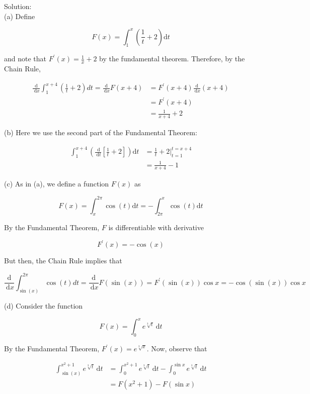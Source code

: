 \documentclass[10pt]{article}
\begin{document}
Solution:\\
(a) Define

$$
F(x)=\int_{1}^{x}\left(\frac{1}{t}+2\right) \mathrm{d} t
$$

and note that $F^{\prime}(x)=\frac{1}{x}+2$ by the fundamental theorem. Therefore, by the Chain Rule,

$$
\begin{aligned}
\frac{\mathrm{d}}{\mathrm{~d} x} \int_{1}^{x+4}\left(\frac{1}{t}+2\right) d t=\frac{\mathrm{d}}{\mathrm{~d} x} F(x+4) & =F^{\prime}(x+4) \frac{\mathrm{d}}{\mathrm{~d} x}(x+4) \\
& =F^{\prime}(x+4) \\
& =\frac{1}{x+4}+2
\end{aligned}
$$

(b) Here we use the second part of the Fundamental Theorem:

$$
\begin{aligned}
\int_{1}^{x+4}\left(\frac{\mathrm{~d}}{\mathrm{~d} t}\left[\frac{1}{t}+2\right]\right) \mathrm{d} t & =\frac{1}{t}+\left.2\right|_{t=1} ^{t=x+4} \\
& =\frac{1}{x+4}-1
\end{aligned}
$$

(c) As in (a), we define a function $F(x)$ as

$$
F(x)=\int_{x}^{2 \pi} \cos (t) \mathrm{d} t=-\int_{2 \pi}^{x} \cos (t) \mathrm{d} t
$$

By the Fundamental Theorem, $F$ is differentiable with derivative

$$
F^{\prime}(x)=-\cos (x)
$$

But then, the Chain Rule implies that

$$
\frac{\mathrm{d}}{\mathrm{~d} x} \int_{\sin (x)}^{2 \pi} \cos (t) d t=\frac{\mathrm{d}}{\mathrm{~d} x} F(\sin (x))=F^{\prime}(\sin (x)) \cos x=-\cos (\sin (x)) \cos x
$$

(d) Consider the function

$$
F(x)=\int_{0}^{x} e^{\sqrt[3]{t}} \mathrm{~d} t
$$

By the Fundamental Theorem, $F^{\prime}(x)=e^{\sqrt[3]{x}}$. Now, observe that

$$
\begin{aligned}
\int_{\sin (x)}^{x^{2}+1} e^{\sqrt[3]{t}} \mathrm{~d} t & =\int_{0}^{x^{2}+1} e^{\sqrt[3]{t}} \mathrm{~d} t-\int_{0}^{\sin x} e^{\sqrt[3]{t}} \mathrm{~d} t \\
& =F\left(x^{2}+1\right)-F(\sin x)
\end{aligned}
$$
\end{document}
